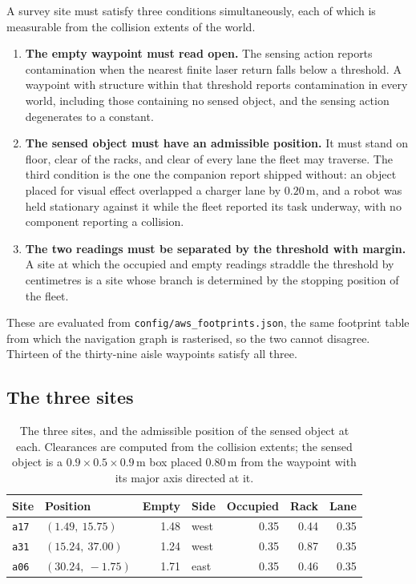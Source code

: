 \documentclass[11pt,a4paper]{article}
\theoremstyle{definition}
\newcommand{\code}[1]{\texttt{\small #1}}
\newcommand{\site}[1]{\code{#1}}
\begin{document}
A survey site must satisfy three conditions simultaneously, each of which is
measurable from the collision extents of the world.

\begin{enumerate}[leftmargin=1.4em, itemsep=2pt]
  \item \textbf{The empty waypoint must read open.} The sensing action reports
        contamination when the nearest finite laser return falls below a
        threshold. A waypoint with structure within that threshold reports
        contamination in every world, including those containing no sensed
        object, and the sensing action degenerates to a constant.
  \item \textbf{The sensed object must have an admissible position.} It must
        stand on floor, clear of the racks, and clear of every lane the fleet
        may traverse. The third condition is the one the companion report
        shipped without: an object placed for visual effect overlapped a
        charger lane by $0.20$\,m, and a robot was held stationary against it
        while the fleet reported its task underway, with no component reporting
        a collision.
  \item \textbf{The two readings must be separated by the threshold with
        margin.} A site at which the occupied and empty readings straddle the
        threshold by centimetres is a site whose branch is determined by the
        stopping position of the fleet.
\end{enumerate}

These are evaluated from \code{config/aws\_footprints.json}, the same footprint
table from which the navigation graph is rasterised, so the two cannot
disagree. Thirteen of the thirty-nine aisle waypoints satisfy all three.

\subsection{The three sites}

\begin{table}[H]
\centering\small
\caption{The three sites, and the admissible position of the sensed object at
each. Clearances are computed from the collision extents; the sensed object is
a $0.9 \times 0.5 \times 0.9$\,m box placed $0.80$\,m from the waypoint with
its major axis directed at it.}
\label{tab:sites}
\begin{tabular}{@{}llrlrrr@{}}
\toprule
\textbf{Site} & \textbf{Position} & \textbf{Empty} & \textbf{Side}
  & \textbf{Occupied} & \textbf{Rack} & \textbf{Lane} \\
\midrule
\site{a17} & $(1.49,\ 15.75)$   & 1.48 & west & 0.35 & 0.44 & 0.35 \\
\site{a31} & $(15.24,\ 37.00)$  & 1.24 & west & 0.35 & 0.87 & 0.35 \\
\site{a06} & $(30.24,\ -1.75)$  & 1.71 & east & 0.35 & 0.46 & 0.35 \\
\bottomrule
\end{tabular}
\end{table}
\end{document}
